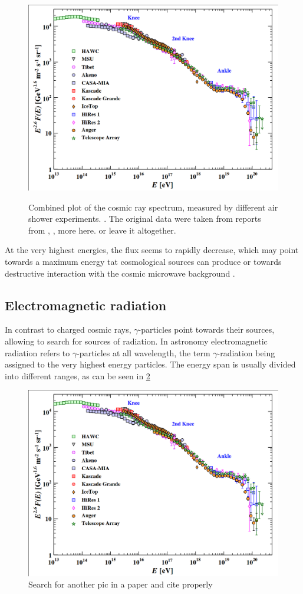 \begin{figure}
	\includegraphics[width=.8\textwidth]{images/cr_spectrum.png}
	\label{fig:cr_spectrum}
	\caption{Combined plot of the cosmic ray spectrum, measured by different air shower experiments. \cite{pdg2019}. 
		The original data were taken from reports from \cite{Alfaro:2017cwx}, 
		\cite{1991ICRC....2...85F}, more here. or leave it altogether.
	}
\end{figure}


At the very highest energies, the flux seems to rapidly decrease, which may point towards a maximum energy
tat cosmological sources can produce or towards destructive interaction with 
the cosmic microwave background \cite{bookap}.

\subsection{Electromagnetic radiation}
In contrast to charged cosmic rays, $\gamma$-particles point towards
their sources, allowing to search for sources of radiation.
In astronomy electromagnetic radiation refers to $\gamma$-particles at all wavelength,
the term $\gamma$-radiation being assigned to the very highest energy particles.
The energy span is usually divided into different ranges, as can be seen in \ref{fig:em_spectrum}

\begin{figure}
	\includegraphics[width=.8\textwidth]{images/cr_spectrum.png}
	\caption{Search for another pic in a paper and cite properly}
	\label{fig:em_spectrum}
\end{figure}


